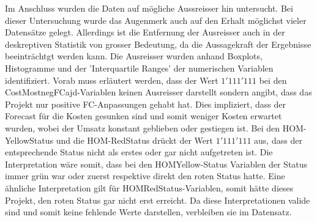 \newline Im Anschluss wurden die Daten auf mögliche Aussreisser hin untersucht. Bei dieser Untersuchung wurde das Augenmerk auch auf den Erhalt möglichst vieler Datensätze gelegt. Allerdings ist die Entfernung der Ausreisser auch in der deskreptiven Statistik von grosser Bedeutung, da die Aussagekraft der Ergebnisse beeinträchtgt werden kann. Die Ausreisser wurden anhand Boxplots, Histogramme und der 'Interquartile Ranges' der numerischen Variablen identifiziert.  Vorab muss erläutert werden, dass der Wert $1'111'111$ bei den CostMostnegFCajd-Variablen keinen Ausreisser darstellt sondern angibt, dass das Projekt nur positive FC-Anpassungen gehabt hat. Dies impliziert, dass der Forecast für die Kosten gesunken sind und somit weniger Kosten erwartet wurden, wobei der Umsatz konstant geblieben oder gestiegen ist. Bei den HOM-YellowStatus und die HOM-RedStatus drückt der Wert $1'111'111$ aus, dass der entsprechende Status nicht als erstes oder gar nicht aufgetreten ist. Die Interpretation wäre somit, dass bei den HOMYellow-Status Variablen der Status immer grün war oder zuerst respektive direkt den roten Status hatte. Eine ähnliche Interpretation gilt für HOMRedStatus-Variablen, somit hätte dieses Projekt, den roten Status gar nicht erst erreicht. Da diese Interpretationen valide sind und somit keine fehlende Werte darstellen, verbleiben sie im Datensatz. 
\newline
